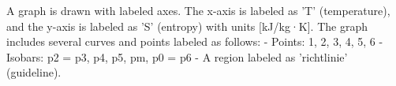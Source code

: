 A graph is drawn with labeled axes. The x-axis is labeled as 'T' (temperature), and the y-axis is labeled as 'S' (entropy) with units [kJ/kg·K]. The graph includes several curves and points labeled as follows:  
- Points: 1, 2, 3, 4, 5, 6  
- Isobars: p2 = p3, p4, p5, pm, p0 = p6  
- A region labeled as 'richtlinie' (guideline).